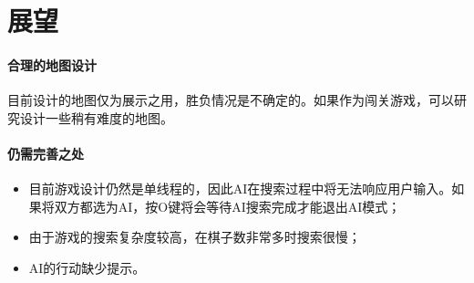 \section{展望}
\paragraph{合理的地图设计}
目前设计的地图仅为展示之用，胜负情况是不确定的。如果作为闯关游戏，可以研究设计一些稍有难度的地图。
\paragraph{仍需完善之处}
\begin{itemize}
\item 目前游戏设计仍然是单线程的，因此AI在搜索过程中将无法响应用户输入。如果将双方都选为AI，按{\ttfamily O}键将会等待AI搜索完成才能退出AI模式；
\item 由于游戏的搜索复杂度较高，在棋子数非常多时搜索很慢；
\item AI的行动缺少提示。
\end{itemize}



